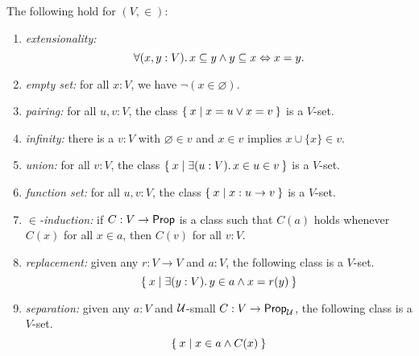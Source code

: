\begin{thm}\label{thm:VisCST}
  The following hold for $(V, {\in})$:
  \begin{enumerate}
  \item \emph{extensionality:}
    \begin{equation*}
      \fall{x, y : V} x \subseteq y \land y \subseteq x \Leftrightarrow x = y.
    \end{equation*}
     \item \emph{empty set:} for all $x:V$, we have $\neg (x\in \varnothing)$.
    \item \emph{pairing:} for all $u, v:V$, the class $\Set{ x | x = u \vee x = v}$ is a $V$-set.
    \item \emph{infinity:} there is a $v:V$ with $\varnothing\in v$ and $x\in v$ implies $x\cup \{x\}\in v$.
  \item \emph{union:} for all $v:V$, the class $\setof{ x | \exis{u:V} x \in u \in v}$ is a $V$-set.
    \item \emph{function set:} for all $u, v:V$, the class $\Set{ x | x : u\to v}$ is a $V$-set.
   \item \emph{$\in$-induction:} if $C : V \to \mathsf{Prop}$ is a class such that $C(a)$ holds whenever $C(x)$ for all $x\in a$, then $C(v)$ for all $v:V$.
     \item \emph{replacement:} given any $r : V \to V$ and $a : V$, the following class  is a $V$-set. 
  $$\setof{ x | \exis{y : V} y \in a \land x = r(y)}$$ 

   \item \emph{separation:} given any $a : V$ and $\mathcal{U}$-small $C : V \to \mathsf{Prop}_\mathcal{U}$, the following class is a $V$-set.
   $$\Set{ x | x \in a \land C(x)}$$
  \end{enumerate}
\end{thm}


